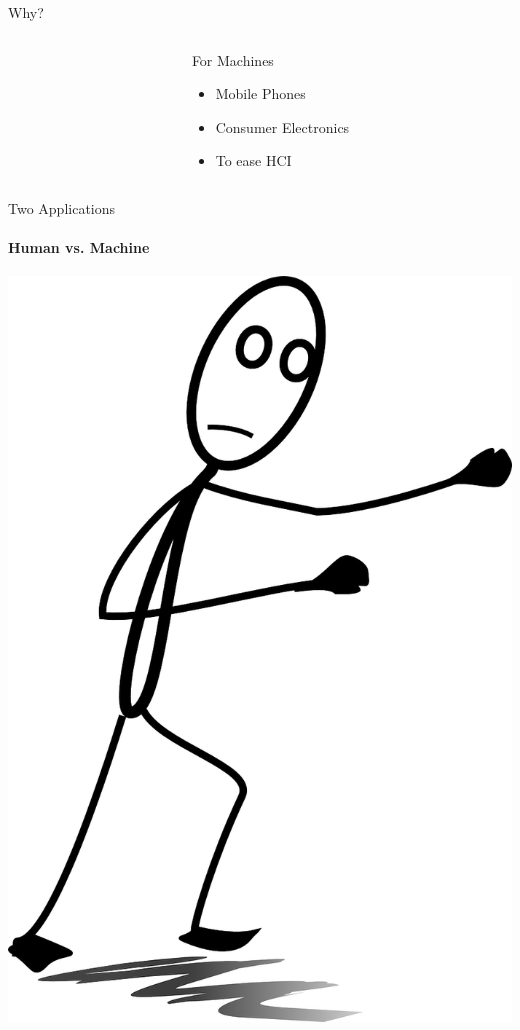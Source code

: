 \begin{frame}{Why?}
\begin{columns}[c]
\begin{column}{0.5\textwidth}
{		}
	\end{column}
	\begin{column}{0.4\textwidth}
		\begin{block}{For Machines}
			\begin{itemize}
				\item<1-> Mobile Phones
				\item<2-> Consumer Electronics
				\item<3-> To ease HCI
			\end{itemize}
		\end{block}
	\end{column}
	\end{columns}
\end{frame}
{\nologo
\begin{frame}{Two Applications}
	\framesubtitle{Human vs. Machine}
	\centering
	\includegraphics[width=\textwidth,height=0.75\textheight,keepaspectratio]{fig/fight.png}

\end{frame}}
